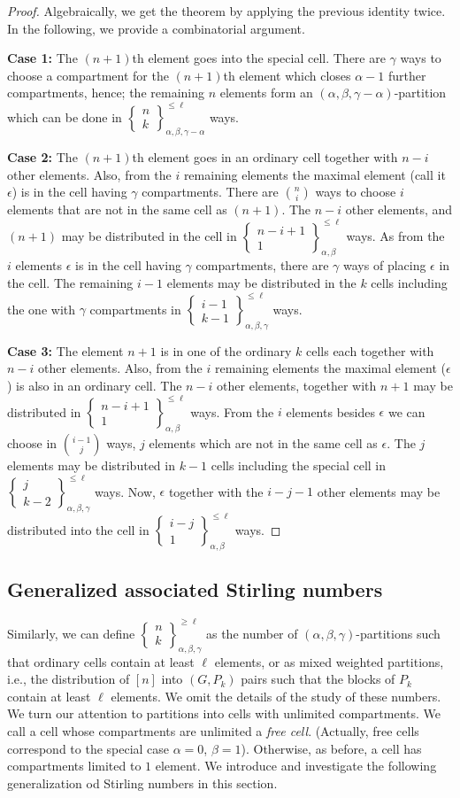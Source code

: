 \documentclass[12pt, reqno]{amsart}
\newtheorem{proof 1}{proof 1}
\def\sts#1#2{\begin{Bmatrix}
#1 \\ #2 \end{Bmatrix}}
\begin{document}
\begin{proof} Algebraically, we get the theorem by applying the previous identity twice. In the following, we provide a combinatorial argument. 

\textbf{Case 1:} The $(n+1)$th element goes into the special cell. There are $\gamma$ ways to choose a compartment for the $(n+1)$th element which closes $\alpha-1$ further compartments, hence; the remaining $n$ elements form an $(\alpha, \beta, \gamma -\alpha)$-partition which can be done in $\sts{n}{k}_{\alpha, \beta, \gamma-\alpha}^{\leq \ell}$ ways.
	
\textbf{Case 2:} The $(n+1)$th element goes in an ordinary cell together with $n-i$ other elements. Also, from the $i$ remaining elements the maximal element (call it $\epsilon$) is in the cell having $\gamma$ compartments. There are $\binom{n}{i}$ ways to choose $i$ elements that are not in the same cell as $(n+1)$. The $n-i$ other elements, and $(n+1)$ may be distributed in the cell in $\sts{n-i+1}{1}_{\alpha,\beta}^{\leq \ell}$ ways. As from the $i$ elements $\epsilon$ is in the cell having $\gamma$ compartments, there are $\gamma$ ways of placing $\epsilon$ in the cell. The remaining $i-1$ elements may be distributed in the $k$ cells including the one with $\gamma$ compartments in $\sts{i-1}{k-1}_{\alpha,\beta,\gamma}^{\leq \ell}$ ways. 

\textbf{Case 3:}  The element $n+1$ is in one of the ordinary  $k$ cells each together with $n-i$ other elements. Also, from the $i$ remaining elements the maximal element ($\epsilon$) is also in an ordinary cell.  The $n-i$ other elements, together with $n+1$ may be distributed  in $\sts{n-i+1}{1}_{\alpha,\beta}^{\leq \ell}$ ways. From the $i$ elements besides $\epsilon$ we can choose in $\binom{i-1}{j}$ ways, $j$ elements which are not in the same cell as $\epsilon$. The $j$ elements may be distributed in $k-1$ cells including the special cell in $\sts{j}{k-2}_{\alpha,\beta,\gamma}^{\leq \ell}$ ways. Now, $\epsilon$ together with the $i-j-1$ other elements may be distributed into the cell in $\sts{i-j}{1}_{\alpha,\beta}^{\leq \ell}$ ways.  
\end{proof}



 
\subsection{Generalized associated Stirling numbers}
Similarly, we can define $\sts{n}{k}_{\alpha,\beta,\gamma}^{\geq \ell}$  as the number of $(\alpha,\beta,\gamma)$-partitions such that ordinary cells contain at least $\ell$ elements, or as mixed weighted partitions, i.e., the distribution of $[n]$ into $(G, P_k)$ pairs such that the blocks of $P_k$ contain at least $\ell$ elements. We omit the details of the study of these numbers. 
We turn our attention to partitions into cells with unlimited compartments. We call a cell whose compartments are unlimited a \emph{free cell}. (Actually, free cells correspond to the special case $\alpha =0$, $\beta =1$). Otherwise, as before, a cell has compartments limited to $1$ element. 
We introduce and investigate the following generalization od Stirling numbers in this section. 
\end{document}
